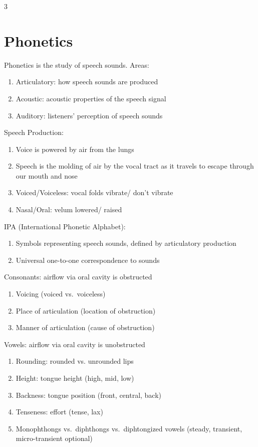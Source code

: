 \documentclass[12pt, a4paper]{article}
\begin{document}
\begin{multicols*}{3}
\colbreak
\section{Phonetics}
Phonetics is the study of speech sounds. Areas:
\begin{enumerate}[\roman*.]
  \item Articulatory: how speech sounds are produced
  \item Acoustic: acoustic properties of the speech signal
  \item Auditory: listeners' perception of speech sounds
\end{enumerate}

Speech Production:
\begin{enumerate}[\roman*.]
  \item Voice is powered by air from the lungs
  \item Speech is the molding of air by the vocal tract as it travels to escape through our mouth and nose
  \item Voiced/Voiceless: vocal folds vibrate/ don't vibrate
  \item Nasal/Oral: velum lowered/ raised
\end{enumerate}
{\centering
\par}\vspace{-1em}

IPA (International Phonetic Alphabet):
\begin{enumerate}[\roman*.]
  \item Symbols representing speech sounds, defined by articulatory production 
  \item Universal one-to-one correspondence to sounds 
\end{enumerate}

Consonants: airflow via oral cavity is obstructed
\begin{enumerate}[\roman*.]
  \item Voicing (voiced vs.\ voiceless)
  \item Place of articulation (location of obstruction)
  \item Manner of articulation (cause of obstruction)
\end{enumerate}
Vowels: airflow via oral cavity is unobstructed
\begin{enumerate}[\roman*.]
  \item Rounding: rounded vs. unrounded lips
  \item Height: tongue height (high, mid, low)
  \item Backness: tongue position (front, central, back)
  \item Tenseness: effort (tense, lax)
  \item Monophthongs vs.\ diphthongs vs.\ diphtongized vowels (steady, transient, micro-transient optional)
\end{enumerate}


\end{multicols*}
\end{document}
